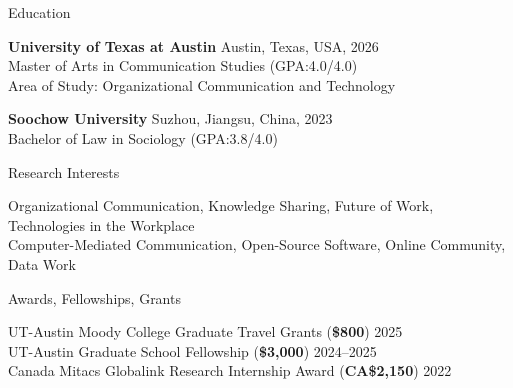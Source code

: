 \documentclass[
	11pt, %
]{resume} %
\begin{document}

\begin{rSection}{Education}
	
	\textbf{University of Texas at Austin} \hfill Austin, Texas, USA, 2026 \\ 
	Master of Arts in Communication Studies (GPA:4.0/4.0) \\
	Area of Study: Organizational Communication and Technology 

    \textbf{Soochow University} \hfill Suzhou, Jiangsu, China, 2023 \\
	Bachelor of Law in Sociology (GPA:3.8/4.0) 
	
\end{rSection}

\begin{rSection}{Research Interests}

Organizational Communication, Knowledge Sharing, Future of Work, Technologies in the Workplace\\
Computer-Mediated Communication, Open-Source Software, Online Community, Data Work

\end{rSection}


\begin{rSection}{Awards, Fellowships, Grants}
	
	UT-Austin Moody College Graduate Travel Grants (\textbf{\$800})  \hfill 2025\\
	UT-Austin Graduate School Fellowship   (\textbf{\$3,000})  \hfill 2024--2025\\
    Canada Mitacs Globalink Research Internship Award     (\textbf{CA\$2,150})  \hfill 2022
	
\end{rSection}

\end{document}
